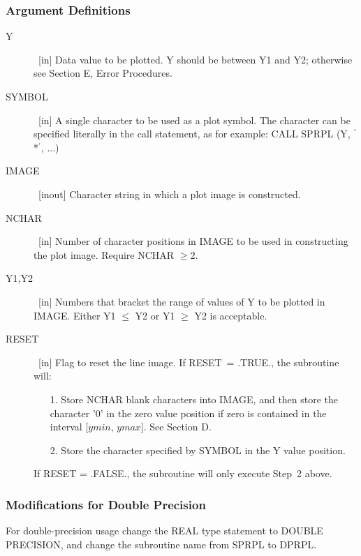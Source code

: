 \documentclass[twoside]{MATH77}
\begin{document}
\subsubsection{Argument Definitions}

\begin{description}
\item[Y] \ [in]  Data value to be plotted.  Y should be between Y1 and Y2;
otherwise see Section E, Error Procedures.
\item[SYMBOL] \ [in]  A single character to be used as a plot symbol.  The character can
be specified literally in the call statement, as for example:
CALL SPRPL (Y, $^\prime $*$^\prime $, ...)
\item[IMAGE] \ [inout]  Character string in which a plot image is constructed.
\item[NCHAR] \ [in]  Number of character positions in IMAGE to be used in constructing
the plot image.  Require NCHAR $\geq  2.$
\item[Y1,Y2] \ [in]  Numbers that bracket the range of values of Y to be plotted in
IMAGE.  Either Y1 $\leq $ Y2 or Y1 $\geq $ Y2 is acceptable.
\item[RESET] \ [in]  Flag to reset the line image.  If RESET\ = .TRUE., the subroutine
will:

\begin{itemize}
\item[1.] Store NCHAR blank characters into IMAGE, and then store the character '0' in
the zero value position if zero is contained in the interval [$ymin$, $ymax$].  See
Section D.

\vspace{3pt}%

\item[2.] Store the character specified by SYMBOL in the Y value position.

\end{itemize}
If RESET = .FALSE., the subroutine will only execute Step~2 above.

\end{description}

\subsubsection{Modifications for Double Precision}

For double-precision usage change the REAL type statement to DOUBLE PRECISION,
and change the subroutine name from SPRPL to DPRPL.
\end{document}
